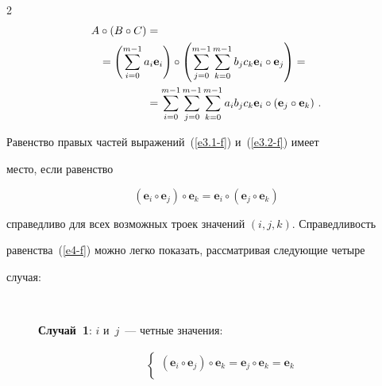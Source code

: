 \begin{multicols}{2}
\begin{align}
 A\circ( B\circ C) &={}\notag\\


  &\hspace*{-15mm}{}= \left( \sum\limits^{m-1}_{i=0} a_i \mathbf{e}_i\right) \circ 


\left( \sum\limits^{m-1}_{j=0} \sum\limits^{m-1}_{k=0} b_j c_k \mathbf{e}_i\circ 


\mathbf{e}_j\right) ={}\notag\\


&{}=\sum\limits_{i=0}^{m-1} \sum\limits_{j=0}^{m-1} 


\sum\limits^{m-1}_{k=0} a_i b_j c_k \mathbf{e}_i\circ \left( \mathbf{e}_j\circ 


\mathbf{e}_k \right)\,.


  \label{e3.2-f}


  \end{align}


  


  Равенство правых частей выражений~(\ref{e3.1-f}) и~(\ref{e3.2-f}) имеет 


место, если равенство


  \begin{equation}


  \left(\mathbf{e}_i\circ\mathbf{e}_j\right)\circ\mathbf{e}_k=\mathbf{e}_i\circ\left


( \mathbf{e}_j\circ\mathbf{e}_k\right)


  \label{e4-f}


  \end{equation}


справедливо для всех возможных троек значений $(i, j, k)$. Справедливость 


равенства~(\ref{e4-f}) можно легко показать, рассматривая следующие четыре 


случая:


\begin{description}


\item[\,]  \textbf{Случай~1}: $i$ и~$j$~--- четные значения: 


  \begin{multline*}


  \left\{ \begin{matrix}


  \left( \mathbf{e}_i\circ \mathbf{e}_j\right) \circ\mathbf{e}_k = \mathbf{e}_j 


\circ \mathbf{e}_k =\mathbf{e}_k\\



\end{matrix}
\end{multline*}
\end{description}
\end{multicols}
